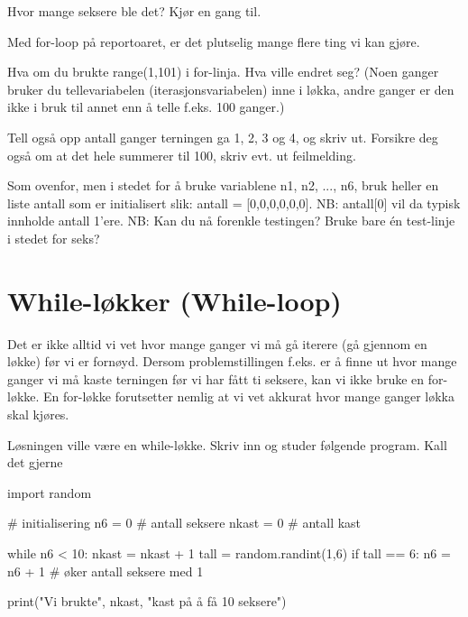 Hvor mange seksere ble det? Kjør en gang til.

Med for-loop på reportoaret, er det plutselig mange flere ting vi kan gjøre. 

\begin{exercise}
Hva om du brukte range(1,101) i for-linja. Hva ville endret seg? (Noen ganger bruker du tellevariabelen (iterasjonsvariabelen) inne i løkka, andre ganger er den ikke i bruk til annet enn å telle f.eks. 100 ganger.)
\end{exercise}

\begin{exercise}
Tell også opp antall ganger terningen ga 1, 2, 3 og 4, og skriv ut.
Forsikre deg også om at det hele summerer til 100, skriv evt. ut feilmelding.
\end{exercise}

\begin{exercise}
Som ovenfor, men i stedet for å bruke variablene n1, n2, ..., n6, bruk heller en liste antall som er initialisert slik: antall = [0,0,0,0,0,0]. NB: antall[0] vil da typisk innholde antall 1'ere. NB: Kan du nå forenkle testingen? Bruke bare én test-linje i stedet for seks? 
\end{exercise}

\section{While-løkker (While-loop)}

Det er ikke alltid vi vet hvor mange ganger vi må gå iterere (gå gjennom en løkke) før vi er fornøyd. Dersom problemstillingen f.eks. er å finne ut hvor mange ganger vi må kaste terningen før vi har fått ti seksere, kan vi ikke bruke en for-løkke. En for-løkke forutsetter nemlig at vi vet akkurat hvor mange ganger løkka skal kjøres.

Løsningen ville være en while-løkke. Skriv inn og studer følgende program. Kall det gjerne 

\begin{usncodebox}
import random

# initialisering
n6    = 0  # antall seksere
nkast = 0  # antall kast

while n6 < 10: 
    nkast = nkast + 1
    tall = random.randint(1,6)
    if tall == 6:
       n6 = n6 + 1    # øker antall seksere med 1
    
print("Vi brukte", nkast, "kast på å få 10 seksere")
\end{usncodebox}

